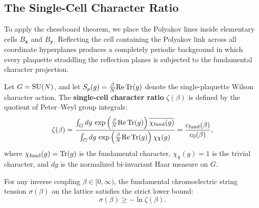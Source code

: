 \subsection{The Single-Cell Character Ratio}
\label{subsec:single_cell_character_ratio}

To apply the chessboard theorem, we place the Polyakov lines inside elementary cells $B_{\mathbf{x}}$ and $B_{\mathbf{y}}$. Reflecting the cell containing the Polyakov link across all coordinate hyperplanes produces a completely periodic background in which every plaquette straddling the reflection planes is subjected to the fundamental character projection.

\begin{definition}
\label{def:single_cell_character_ratio}
Let $G = \mathrm{SU}(N)$, and let $S_p(g) = \frac{\beta}{N} \mathrm{Re} \, \mathrm{Tr}(g)$ denote the single-plaquette Wilson character action. The \textbf{single-cell character ratio} $\zeta(\beta)$ is defined by the quotient of Peter--Weyl group integrals:
\begin{equation}
\label{eq:single_cell_ratio_def}
\zeta(\beta) = \frac{\int_G dg \, \exp\left( \frac{\beta}{N} \mathrm{Re} \, \mathrm{Tr}(g) \right) \overline{\chi_{\mathrm{fund}}(g)}}{\int_G dg \, \exp\left( \frac{\beta}{N} \mathrm{Re} \, \mathrm{Tr}(g) \right) \chi_{\mathbf{1}}(g)} = \frac{c_{\mathrm{fund}}(\beta)}{c_0(\beta)},
\end{equation}
where $\chi_{\mathrm{fund}}(g) = \mathrm{Tr}(g)$ is the fundamental character, $\chi_{\mathbf{1}}(g) = 1$ is the trivial character, and $dg$ is the normalized bi-invariant Haar measure on $G$.
\end{definition}

\begin{theorem}
\label{thm:single_cell_flux}
For any inverse coupling $\beta \in [0, \infty)$, the fundamental chromoelectric string tension $\sigma(\beta)$ on the lattice satisfies the strict lower bound:
\begin{equation}
\label{eq:single_cell_bound}
\sigma(\beta) \ge -\ln \zeta(\beta).
\end{equation}
\end{theorem}

